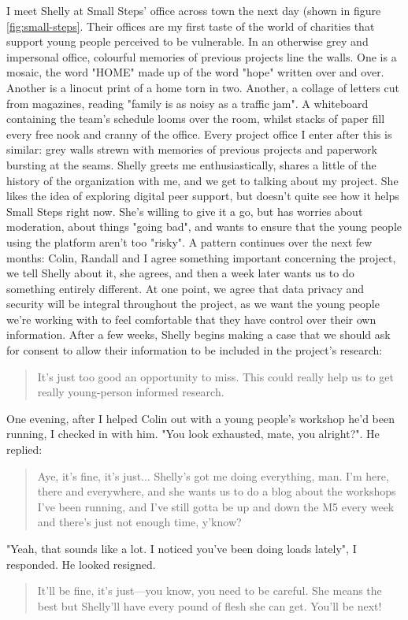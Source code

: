 I meet Shelly at Small Steps' office across town the next day (shown in figure \ref{fig:small-steps}. Their offices are my first taste of the world of charities that support young people perceived to be vulnerable. In an otherwise grey and impersonal office, colourful memories of previous projects line the walls. One is a mosaic, the word "HOME" made up of the word "hope" written over and over. Another is a linocut print of a home torn in two. Another, a collage of letters cut from magazines, reading "family is as noisy as a traffic jam". A whiteboard containing the team's schedule looms over the room, whilst stacks of paper fill every free nook and cranny of the office. Every project office I enter after this is similar: grey walls strewn with memories of previous projects and paperwork bursting at the seams. Shelly greets me enthusiastically, shares a little of the history of the organization with me, and we get to talking about my project. She likes the idea of exploring digital peer support, but doesn't quite see how it helps Small Steps right now. She's willing to give it a go, but has worries about moderation, about things "going bad", and wants to ensure that the young people using the platform aren't too "risky". A pattern continues over the next few months: Colin, Randall and I agree something important concerning the project, we tell Shelly about it, she agrees, and then a week later wants us to do something entirely different. At one point, we agree that data privacy and security will be integral throughout the project, as we want the young people we're working with to feel comfortable that they have control over their own information. After a few weeks, Shelly begins making a case that we should ask for consent to allow their information to be included in the project's research:
\begin{quote}
It's just too good an opportunity to miss. This could really help us to get really young-person informed research.
\end{quote}
One evening, after I helped Colin out with a young people's workshop he'd been running, I checked in with him. "You look exhausted, mate, you alright?". He replied:
\begin{quote}
Aye, it's fine, it's just... Shelly's got me doing everything, man. I'm here, there and everywhere, and she wants us to do a blog about the workshops I've been running, and I've still gotta be up and down the M5 every week and there's just not enough time, y'know?
\end{quote}
"Yeah, that sounds like a lot. I noticed you've been doing loads lately", I responded. He looked resigned.
\begin{quote}
It'll be fine, it's just—you know, you need to be careful. She means the best but Shelly'll have every pound of flesh she can get. You'll be next!    
\end{quote}

